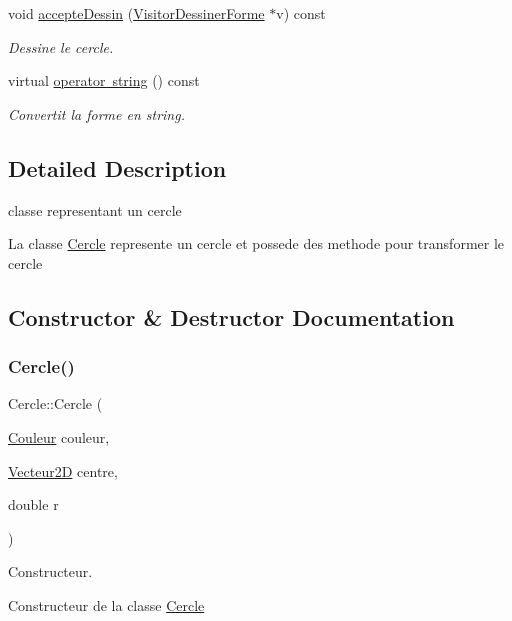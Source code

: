 \begin{DoxyCompactItemize}
void \mbox{\hyperlink{class_cercle_afb719f00d2e1881449997816263b748a}{accepte\+Dessin}} (\mbox{\hyperlink{class_visitor_dessiner_forme}{Visitor\+Dessiner\+Forme}} $\ast$v) const
\begin{DoxyCompactList}\small\item\em Dessine le cercle. \end{DoxyCompactList}\item 
\mbox{\label{class_cercle_a01dfce2b49afb0dcb5bd176d4145b71a}} 
virtual \mbox{\hyperlink{class_cercle_a01dfce2b49afb0dcb5bd176d4145b71a}{operator string}} () const
\begin{DoxyCompactList}\small\item\em Convertit la forme en string. \end{DoxyCompactList}\end{DoxyCompactItemize}


\subsection{Detailed Description}
classe representant un cercle 

La classe \mbox{\hyperlink{class_cercle}{Cercle}} represente un cercle et possede des methode pour transformer le cercle 

\subsection{Constructor \& Destructor Documentation}
\mbox{\label{class_cercle_a581cf3e50c4c61f98260340a7e30903f}} 
\subsubsection{\texorpdfstring{Cercle()}{Cercle()}}
{\footnotesize\ttfamily Cercle\+::\+Cercle (\begin{DoxyParamCaption}\item[{\mbox{\hyperlink{class_couleur}{Couleur}}}]{couleur,  }\item[{\mbox{\hyperlink{class_vecteur2_d}{Vecteur2D}}}]{centre,  }\item[{double}]{r }\end{DoxyParamCaption})}



Constructeur. 

Constructeur de la classe \mbox{\hyperlink{class_cercle}{Cercle}}


